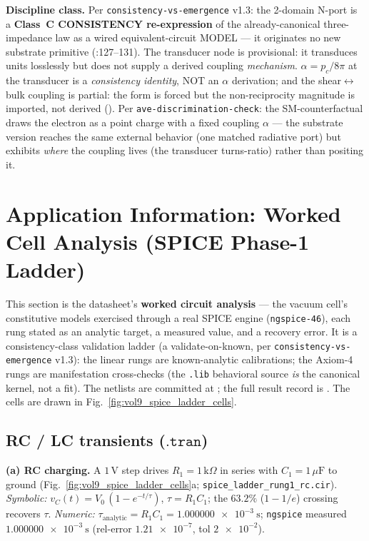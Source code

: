 \textbf{Discipline class.} Per \texttt{consistency-vs-emergence} v1.3: the 2-domain N-port is a \textbf{Class~C CONSISTENCY re-expression} of the already-canonical three-impedance law as a wired equivalent-circuit MODEL --- it originates no new substrate primitive (:127--131). The transducer node is provisional: it transduces units losslessly but does not supply a derived coupling \emph{mechanism}. $\alpha = p_c/8\pi$ at the transducer is a \emph{consistency identity}, NOT an $\alpha$ derivation; and the shear$\leftrightarrow$bulk coupling is partial: the form is forced but the non-reciprocity magnitude is imported, not derived (). Per \texttt{ave-discrimination-check}: the SM-counterfactual draws the electron as a point charge with a fixed coupling $\alpha$ --- the substrate version reaches the same external behavior (one matched radiative port) but exhibits \emph{where} the coupling lives (the transducer turns-ratio) rather than positing it.

\section{Application Information: Worked Cell Analysis (SPICE Phase-1 Ladder)}
\label{sec:vol9_app_worked_spice_ladder}

This section is the datasheet's \textbf{worked circuit analysis} --- the vacuum cell's constitutive models exercised through a real SPICE engine (\texttt{ngspice-46}), each rung stated as an analytic target, a measured value, and a recovery error. It is a consistency-class validation ladder (a validate-on-known, per \texttt{consistency-vs-emergence} v1.3): the linear rungs are known-analytic calibrations; the Axiom-4 rungs are manifestation cross-checks (the \texttt{.lib} behavioral source \emph{is} the canonical kernel, not a fit). The netlists are committed at ; the full result record is . The cells are drawn in Fig.~\ref{fig:vol9_spice_ladder_cells}.



\subsection{RC / LC transients ($\mathtt{.tran}$)}
\label{subsec:vol9_app_spice_rc_lc}

\textbf{(a) RC charging.} A $1\,\mathrm{V}$ step drives $R_1 = 1\,\mathrm{k}\Omega$ in series with $C_1 = 1\,\mu\mathrm{F}$ to ground (Fig.~\ref{fig:vol9_spice_ladder_cells}a; \texttt{spice\_ladder\_rung1\_rc.cir}). \emph{Symbolic:} $v_C(t) = V_0\,(1 - e^{-t/\tau})$, $\tau = R_1 C_1$; the $63.2\%$ ($1 - 1/e$) crossing recovers $\tau$. \emph{Numeric:} $\tau_{\mathrm{analytic}} = R_1 C_1 = \qty{1.000000e-3}{\second}$; \texttt{ngspice} measured $\qty{1.000000e-3}{\second}$ (rel-error $\num{1.21e-7}$, tol $\num{2e-2}$).

